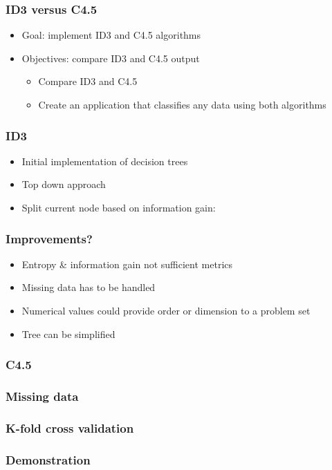 \documentclass{beamer}
\begin{document}
\begin{frame}
\frametitle{ID3 versus C4.5}
	\begin{itemize}
		\item Goal: implement ID3 and C4.5 algorithms
		\vfill
		\item Objectives: compare ID3 and C4.5 output
		\vfill
		\begin{itemize}
			\item Compare ID3 and C4.5
			\vfill
			\item Create an application that classifies any data using both algorithms
		\end{itemize}

	\end{itemize}

\end{frame}

\begin{frame}
\frametitle{ID3}
\begin{itemize}
\item Initial implementation of decision trees
\item Top down approach
\item Split current node based on information gain:

\end{itemize}

\end{frame}
\begin{frame}
\frametitle{Improvements?}
\begin{itemize}
\item Entropy \& information gain not sufficient metrics
\vfill
\item Missing data has to be handled
\vfill
\item Numerical values could provide order or dimension to a problem set
\vfill
\item Tree can be simplified
\end{itemize}
\end{frame}
\begin{frame}
\frametitle{C4.5}

\end{frame}


\begin{frame}
\frametitle{Missing data}

\end{frame}




















\begin{frame}
\frametitle{K-fold cross validation}

\end{frame}

\begin{frame}
\frametitle{Demonstration}

\end{frame}
\end{document}
